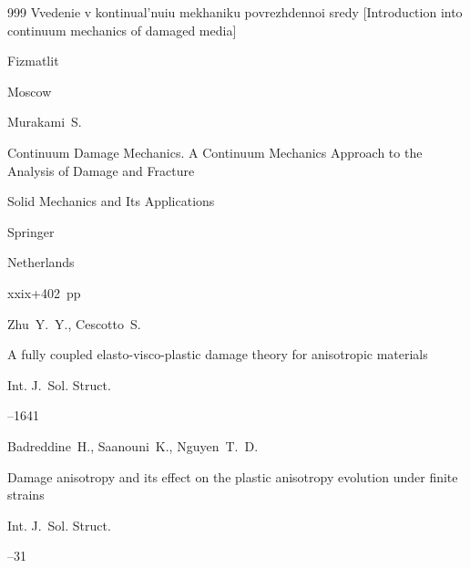 \begin{thebibliography}{999}
\book Vvedenie v kontinual'nuiu mekhaniku povrezhdennoi sredy \rm [Introduction into continuum mechanics of damaged media]


\publ Fizmatlit

\publaddr Moscow













\by Murakami~S. 

\book Continuum Damage Mechanics. A Continuum Mechanics Approach to the Analysis of Damage and Fracture

\serial Solid Mechanics and Its Applications



\publ Springer

\publaddr Netherlands

\totalpages xxix+402~pp \nofrills







\by Zhu~Y.~Y., Cescotto~S. 

\paper A fully coupled elasto-visco-plastic damage theory for anisotropic materials

\jour Int. J.~Sol. Struct.




--1641






\by Badreddine~H., Saanouni~K., Nguyen~T.~D.

\paper Damage anisotropy and its effect on the plastic anisotropy evolution under finite strains

\jour Int. J.~Sol. Struct.



--31


\end{thebibliography}
